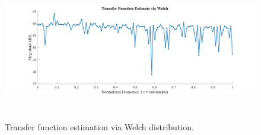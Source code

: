 \begin{enumerate}[label=\roman*]

\begin{figure}[H]
	\begin{Center}
		\includegraphics[width=6.51in,height=2.44in]{29}
		\caption{Transfer function estimation via Welch distribution.}
		\label{fig:_15_Transfer_function_estimation_via_Welch_distribution}
	\end{Center}
\end{figure}



\par

\par


\vspace{\baselineskip}


%



\par

\par


\end{enumerate}
